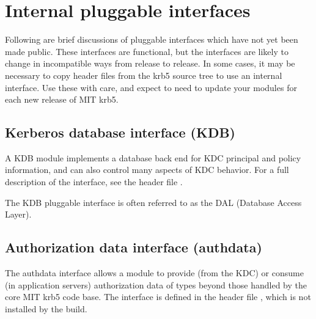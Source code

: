 \documentclass[letterpaper,10pt,english]{sphinxmanual}
\begin{document}
\section{Internal pluggable interfaces}
\label{plugindev/internal::doc}\label{plugindev/internal:internal-pluggable-interfaces}
Following are brief discussions of pluggable interfaces which have not
yet been made public.  These interfaces are functional, but the
interfaces are likely to change in incompatible ways from release to
release.  In some cases, it may be necessary to copy header files from
the krb5 source tree to use an internal interface.  Use these with
care, and expect to need to update your modules for each new release
of MIT krb5.


\subsection{Kerberos database interface (KDB)}
\label{plugindev/internal:kerberos-database-interface-kdb}
A KDB module implements a database back end for KDC principal and
policy information, and can also control many aspects of KDC behavior.
For a full description of the interface, see the header file
.

The KDB pluggable interface is often referred to as the DAL (Database
Access Layer).


\subsection{Authorization data interface (authdata)}
\label{plugindev/internal:authorization-data-interface-authdata}
The authdata interface allows a module to provide (from the KDC) or
consume (in application servers) authorization data of types beyond
those handled by the core MIT krb5 code base.  The interface is
defined in the header file , which is not
installed by the build.



\renewcommand{\indexname}{Index}
\printindex
\end{document}
